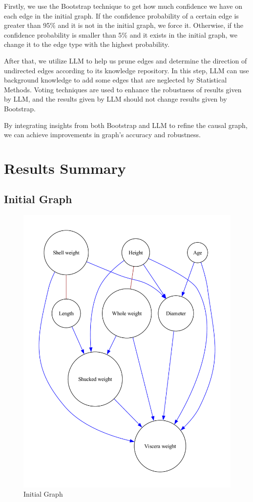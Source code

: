 \documentclass{article}
\begin{document}
Firstly, we use the Bootstrap technique to get how much confidence we have on each edge in the initial graph.
If the confidence probability of a certain edge is greater than 95\% and it is not in the initial graph, we force it.
Otherwise, if the confidence probability is smaller than 5\% and it exists in the initial graph, we change it to the edge type with the highest probability.
            
After that, we utilize LLM to help us prune edges and determine the direction of undirected edges according to its knowledge repository.
In this step, LLM can use background knowledge to add some edges that are neglected by Statistical Methods.
Voting techniques are used to enhance the robustness of results given by LLM, and the results given by LLM should not change results given by Bootstrap.

By integrating insights from both Bootstrap and LLM to refine the causal graph, we can achieve improvements in graph's accuracy and robustness.

\section{Results Summary}

\subsection{Initial Graph}

\begin{figure}[H]
    \centering
    \includegraphics[width=\linewidth]{./demo_data/20241104_111650/Abalone/output_graph/initial_graph.pdf}
    \caption{Initial Graph}
\end{figure}
\end{document}
